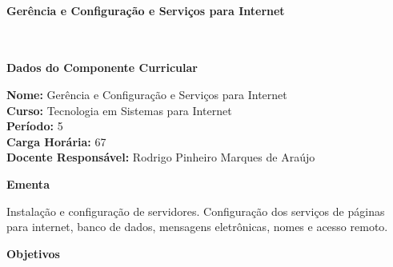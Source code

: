 \paragraph{Gerência e Configuração e Serviços para Internet} \


\begin{snugshade}\begin{center}\textbf{
    Dados do Componente Curricular
}\end{center}\end{snugshade}

\noindent \textbf{Nome:}                Gerência e Configuração e Serviços para Internet
\\        \textbf{Curso:}               Tecnologia em Sistemas para Internet
\\        \textbf{Período:}             \unit{5}{\degree}
\\        \textbf{Carga Horária:}       \unit{67}{\hour}
\\        \textbf{Docente Responsável:} Rodrigo Pinheiro Marques de Araújo


\begin{snugshade}\begin{center}\textbf{
    Ementa
\vphantom{q}}\end{center}\end{snugshade}

\noindent
Instalação e configuração de servidores. Configuração dos serviços de páginas para internet, banco de dados, mensagens eletrônicas, nomes e acesso remoto.


\begin{snugshade}\begin{center}\textbf{
    Objetivos
}\end{center}\end{snugshade}

